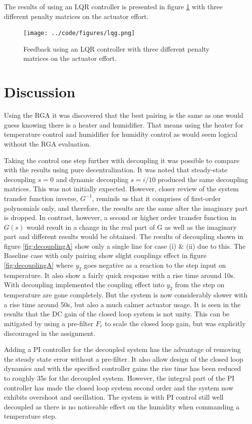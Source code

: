 \documentclass[a4paper, titlepage]{article}
\begin{document}
The results of using an LQR controller is presented in figure \ref{fig:lqgControl} with three different penalty matrices on the actuator effort. 

\begin{figure}[H]
\center
\texttt{[image: ../code/figures/lqg.png]}
\caption{Feedback using an LQR controller with three different penalty matrices on the actuator effort.}
\label{fig:lqgControl}
\end{figure}


\section{Discussion}

Using the RGA it was discovered that the best pairing is the same as one would guess knowing there is a heater and humidifier.
That means using the heater for temperature control and humidifier for humidity control as would seem logical without the RGA evaluation.

Taking the control one step further with decoupling it was possible to compare with the results using pure decentralization.
It was noted that steady-state decoupling $s=0$ and dynamic decoupling $s=i/10$ produced the same decoupling matrices.
This was not initially expected.
However, closer review of the system transfer function inverse, $G^{-1}$, reminds us that it comprises of first-order polynomials only, and therefore, the results are the same after the imaginary part is dropped.
In contrast, however, a second or higher order transfer function in $G(s)$ would result in a change in the real part of G as well as the imaginary part and different results would be obtained.
The results of decoupling shown in figure \ref{fig:decouplingA} show only a single line for case (i) \& (ii) due to this.
The Baseline case with only pairing show slight couplings effect in figure \ref{fig:decouplingA} where $y_2$ goes negative as a reaction to the step input on temperature.
It also show a fairly quick response with a rise time around 10s.
With decoupling implemented the coupling effect into $y_2$ from the step on temperature are gone completely.
But the system is now considerably slower with a rise time around 50s, but also a much calmer actuator usage.
It is seen in the results that the DC gain of the closed loop system is not unity.
This can be mitigated by using a pre-filter $F_r$ to scale the closed loop gain, but was explicitly discouraged in the assignment.

Adding a PI controller for the decoupled system has the advantage of removing the steady state error without a pre-filter.
It also allow design of the closed loop dynamics and with the specified controller gains the rise time has been reduced to roughly 35s for the decoupled system.
However, the integral part of the PI controller has made the closed loop system second order and the system now exhibits overshoot and oscillation.
The system is with PI control still well decoupled as there is no noticeable effect on the humidity when commanding a temperature step.
\end{document}
